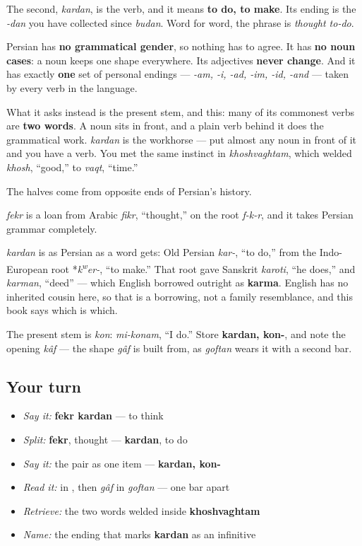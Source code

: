 The second, \textbf{} \emph{kardan}, is the verb, and it means \textbf{to do, to make}. Its ending is the \emph{-dan} you have collected since \emph{budan}. Word for word, the phrase is \emph{thought to-do}.

\begin{grammarlens}[title={Grammar Lens: Persian asks less of you than you fear}]
Persian has \textbf{no grammatical gender}, so nothing has to agree. It has \textbf{no noun cases}: a noun keeps one shape everywhere. Its adjectives \textbf{never change}. And it has exactly \textbf{one} set of personal endings — \emph{-am, -i, -ad, -im, -id, -and} — taken by every verb in the language.

What it asks instead is the present stem, and this: many of its commonest verbs are \textbf{two words}. A noun sits in front, and a plain verb behind it does the grammatical work. \textbf{} \emph{kardan} is the workhorse — put almost any noun in front of it and you have a verb. You met the same instinct in \emph{khoshvaghtam}, which welded \emph{khosh}, “good,” to \emph{vaqt}, “time.”
\end{grammarlens}

\begin{cousinweb}
The halves come from opposite ends of Persian's history.

\textbf{} \emph{fekr} is a loan from Arabic \emph{fikr}, “thought,” on the root \emph{f-k-r}, and it takes Persian grammar completely.

\textbf{} \emph{kardan} is as Persian as a word gets: Old Persian \emph{kar-}, “to do,” from the Indo-European root *\emph{k\textsuperscript{w}er-}, “to make.” That root gave Sanskrit \emph{karoti}, “he does,” and \emph{karman}, “deed” — which English borrowed outright as \textbf{karma}. English has no inherited cousin here, so that is a borrowing, not a family resemblance, and this book says which is which.

The present stem is \textbf{} \emph{kon}: \emph{mi-konam}, “I do.” Store \textbf{kardan, kon-}, and note the opening \textbf{} \emph{kâf} — the shape \emph{gâf} is built from, as \emph{goftan} wears it with a second bar.
\end{cousinweb}

\subsection*{Your turn}
\begin{itemize}
\raggedright
  \item \emph{Say it:} \textbf{fekr kardan} — to think
  \item \emph{Split:} \textbf{fekr}, thought — \textbf{kardan}, to do
  \item \emph{Say it:} the pair as one item — \textbf{kardan, kon-}
  \item \emph{Read it:} \textbf{} in \textbf{}, then \emph{gâf} in \emph{goftan} — one bar apart
  \item \emph{Retrieve:} the two words welded inside \textbf{khoshvaghtam}
  \item \emph{Name:} the ending that marks \textbf{kardan} as an infinitive
\end{itemize}

